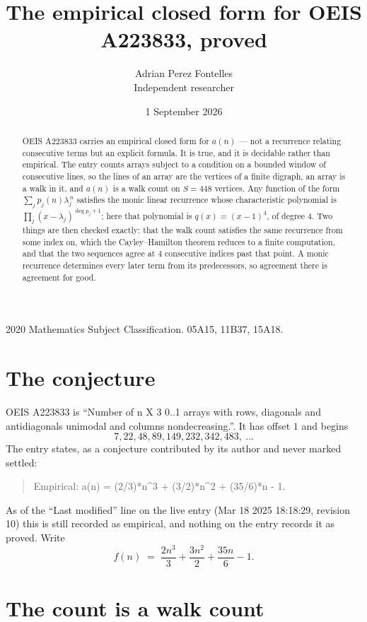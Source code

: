 \documentclass[11pt,a4paper]{article}
\title{The empirical closed form for OEIS A223833, proved}
\author{Adrian Perez Fontelles\\ \small Independent researcher}
\date{1 September 2026}
\theoremstyle{plain}
\theoremstyle{definition}
\begin{document}
\maketitle

\begin{abstract}
OEIS A223833 carries an empirical closed form for $a(n)$ --- not a recurrence relating
consecutive terms but an explicit formula. It is true, and it is decidable rather than
empirical. The entry counts arrays subject to a condition on a bounded window of consecutive lines, so the lines of an array are the
vertices of a finite digraph, an array is a walk in it, and $a(n)$ is a walk count on
$S=448$ vertices. Any function of the form $\sum_j p_j(n)\lambda_j^{\,n}$ satisfies the
monic linear recurrence whose characteristic polynomial is
$\prod_j(x-\lambda_j)^{\deg p_j+1}$; here that polynomial is $q(x)=(x-1)^{4}$, of degree
$4$. Two things are then checked exactly: that the walk count satisfies the same
recurrence from some index on, which the Cayley--Hamilton theorem reduces to a finite
computation, and that the two sequences agree at $4$ consecutive indices past that
point. A monic recurrence determines every later term from its predecessors, so agreement
there is agreement for good.
\end{abstract}

\noindent\small 2020 Mathematics Subject Classification. 05A15, 11B37, 15A18.\normalsize

\section{The conjecture}

OEIS A223833 is ``Number of n X 3 0..1 arrays with rows, diagonals and antidiagonals unimodal and columns nondecreasing.''. It has offset $1$ and begins
\[
7, 22, 48, 89, 149, 232, 342, 483,\ \dots
\]
The entry states, as a conjecture contributed by its author and never marked settled:
\begin{quote}
Empirical: a(n) = (2/3)*n\^{}3 + (3/2)*n\^{}2 + (35/6)*n - 1.
\end{quote}
As of the ``Last modified'' line on the live entry (Mar 18 2025 18:18:29, revision 10) this is still
recorded as empirical, and nothing on the entry records it as proved. Write
\[
f(n)\;=\;\frac{2 n^{3}}{3} + \frac{3 n^{2}}{2} + \frac{35 n}{6} - 1.
\]

\section{The count is a walk count}
\end{document}
